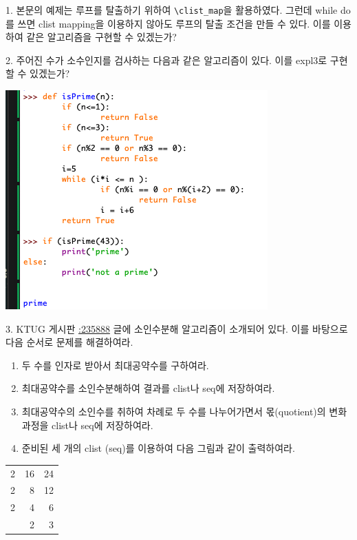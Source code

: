 \documentclass[a4paper,amsmath]{oblivoir}
\makeatletter
\let\ATonum\@onum
\makeatother
\begin{document}
\vfill

\begin{questionp}

 1. 본문의 예제는 루프를 탈출하기 위하여 \verb|\clist_map|을 활용하였다.
그런데 while do를 쓰면 clist mapping을 이용하지 않아도 루프의 탈출 조건을 
만들 수 있다. 이를 이용하여 같은 알고리즘을 구현할 수 있겠는가?

\bigskip

 2. 주어진 수가 소수인지를 검사하는 다음과 같은 알고리즘이 있다. 이를 expl3로 구현할 수 있겠는가?

\medskip

\includegraphics[scale=.78]{Screenshot-2}


\bigskip

 3. KTUG 게시판 \href{http://www.ktug.org/xe/index.php?document_srl=235888&mid=KTUG_open_board}{:235888} 글에 소인수분해 알고리즘이 소개되어 있다. 
이를 바탕으로 다음 순서로 문제를 해결하여라.
\begin{enumerate}[\ \ \expandafter\ATonum1] \firmlist
\item 두 수를 인자로 받아서 최대공약수를 구하여라.
\item 최대공약수를 소인수분해하여 결과를 clist나 seq에 저장하여라.
\item 최대공약수의 소인수를 취하여 차례로 두 수를 나누어가면서 몫(quotient)의 변화 과정을 clist나 seq에 저장하여라.
\item 준비된 세 개의 clist (seq)를 이용하여 다음 그림과 같이 출력하여라.
\end{enumerate}
\begin{center}
\begin{tabular}{r|rr}
2 & 16 & 24 \\ \cline{2-3}
2 & 8  & 12 \\ \cline{2-3}
2 & 4 & 6 \\ \cline{2-3}
  & 2 & 3 \\ 
\end{tabular}
\end{center}


\end{questionp}
\end{document}
